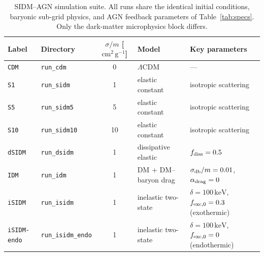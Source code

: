 \documentclass[fleqn,usenatbib]{mnras}
\newcommand{\code}[1]{\texttt{#1}}
\newcommand{\sigmam}{\sigma/m}
\newcommand{\LCDM}{\Lambda\mathrm{CDM}}
\begin{document}
\begin{table}
\centering
\caption{SIDM--AGN simulation suite.  All runs share the identical
  initial conditions, baryonic sub-grid physics, and AGN feedback
  parameters of Table~\ref{tab:specs}.  Only the dark-matter
  microphysics block differs.}
\label{tab:runs}
\begin{tabular}{llcll}
\toprule
Label & Directory & $\sigmam$ [$\mathrm{cm^2\,g^{-1}}$]
      & Model & Key parameters \\
\midrule
\code{CDM}   & \code{run\_cdm}        & 0   & $\LCDM$
  & --- \\
\code{S1}    & \code{run\_sidm}       & 1   & elastic constant
  & isotropic scattering \\
\code{S5}    & \code{run\_sidm5}      & 5   & elastic constant
  & isotropic scattering \\
\code{S10}   & \code{run\_sidm10}     & 10  & elastic constant
  & isotropic scattering \\
\code{dSIDM} & \code{run\_dsidm}      & 1   & dissipative elastic
  & $f_{\rm diss} = 0.5$ \\
\code{IDM}   & \code{run\_idm}        & 1   & DM $+$ DM--baryon drag
  & $\sigma_{\rm db}/m = 0.01$, $\alpha_{\rm drag}=0$ \\
\code{iSIDM} & \code{run\_isidm}      & 1   & inelastic two-state
  & $\delta=100\,\mathrm{keV}$, $f_{\rm exc,0}=0.3$ (exothermic) \\
\code{iSIDM-endo} & \code{run\_isidm\_endo} & 1 & inelastic two-state
  & $\delta=100\,\mathrm{keV}$, $f_{\rm exc,0}=0$ (endothermic) \\
\bottomrule
\end{tabular}
\end{table}
\end{document}
